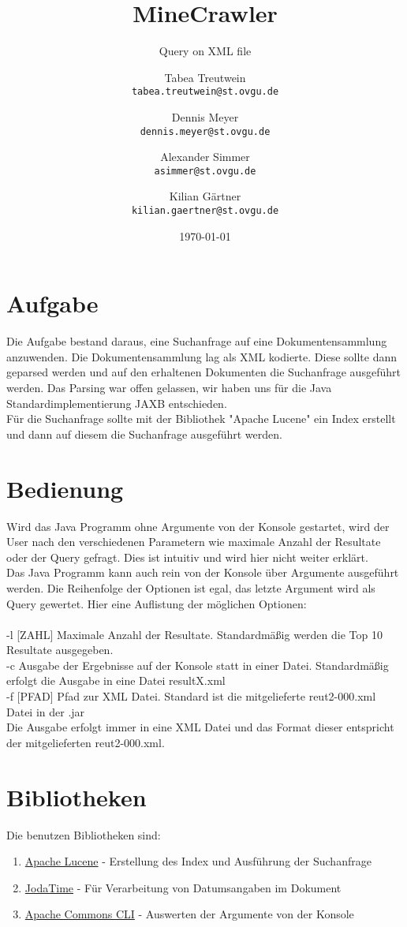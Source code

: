 \documentclass{scrartcl}
\title{MineCrawler}
\subtitle{Query on XML file}
\author{
  Tabea Treutwein\\
  \texttt{tabea.treutwein@st.ovgu.de}\\
  \and
  Dennis Meyer\\
  \texttt{dennis.meyer@st.ovgu.de}\\
  \and
  Alexander Simmer\\
  \texttt{asimmer@st.ovgu.de}\\
  \and
  Kilian Gärtner\\
  \texttt{kilian.gaertner@st.ovgu.de}\\
}
\date{\today}
\begin{document}
\maketitle
 
\section{Aufgabe}
Die Aufgabe bestand daraus, eine Suchanfrage auf eine Dokumentensammlung anzuwenden. Die Dokumentensammlung lag als XML kodierte. Diese sollte dann geparsed werden und auf den erhaltenen Dokumenten die Suchanfrage ausgeführt werden. Das Parsing war offen gelassen, wir haben uns für die Java Standardimplementierung JAXB entschieden. \\
Für die Suchanfrage sollte mit der Bibliothek "Apache Lucene" ein Index erstellt und dann auf diesem die Suchanfrage ausgeführt werden.
 
\section{Bedienung}
Wird das Java Programm ohne Argumente von der Konsole gestartet, wird der User nach den verschiedenen Parametern wie maximale Anzahl der Resultate oder der Query gefragt. Dies ist intuitiv und wird hier nicht weiter erklärt.\\
Das Java Programm kann auch rein von der Konsole über Argumente ausgeführt werden. 
Die Reihenfolge der Optionen ist egal, das letzte Argument wird als Query gewertet.
Hier eine Auflistung der möglichen Optionen:\\\\
-l [ZAHL] Maximale Anzahl der Resultate. Standardmäßig werden die Top 10 Resultate ausgegeben.\\
-c Ausgabe der Ergebnisse auf der Konsole statt in einer Datei. Standardmäßig erfolgt die Ausgabe in eine Datei resultX.xml\\
-f [PFAD] Pfad zur XML Datei. Standard ist die mitgelieferte reut2-000.xml Datei in der .jar\\
Die Ausgabe erfolgt immer in eine XML Datei und das Format dieser entspricht der mitgelieferten reut2-000.xml.
\section{Bibliotheken}
Die benutzen Bibliotheken sind:
\begin{enumerate}
	\item \href{http://lucene.apache.org/}{Apache Lucene} - Erstellung des Index und Ausführung der Suchanfrage
	\item \href{http://www.joda.org/joda-time/}{JodaTime} - Für Verarbeitung von Datumsangaben im Dokument
	\item \href{http://commons.apache.org/proper/commons-cli/}{Apache Commons CLI} - Auswerten der Argumente von der Konsole
\end{enumerate}
\end{document}

